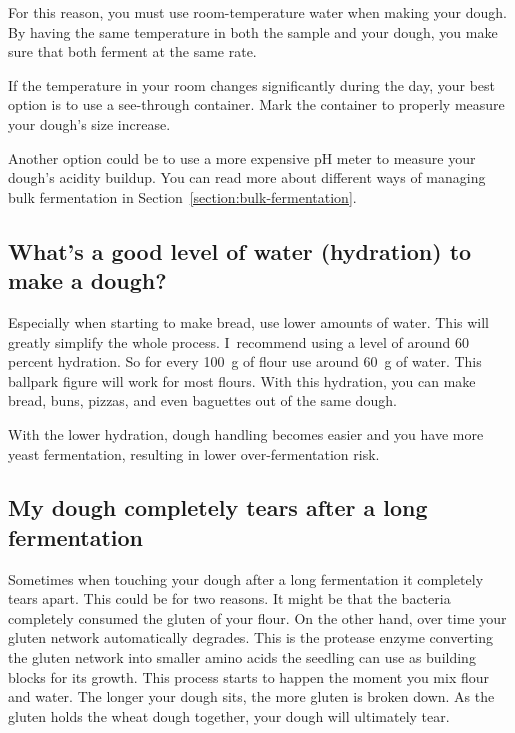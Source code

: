 For this reason, you must use room-temperature water when
making your dough. By having the same temperature in both the sample
and your dough, you make sure that both ferment at the same rate.

If the temperature in your room changes significantly during the day, your
best option is to use a see-through container. Mark the container to properly
measure your dough's size increase.

Another option could be to use a more expensive pH meter to measure your
dough's acidity buildup. You can read more about different ways of managing
bulk fermentation in Section~\ref{section:bulk-fermentation}.

\subsection{What's a good level of water (hydration) to make a dough?}

Especially when starting to make bread, use lower amounts of water. This will
greatly simplify the whole process. I~recommend using a level of around 60
percent hydration. So for every \qty{100}{\gram} of flour use around \qty{60}{\gram} of water.
This ballpark figure will work for most flours. With this hydration, you can
make bread, buns, pizzas, and even baguettes out of the same dough.

With the lower hydration, dough handling becomes easier and you have more yeast
fermentation, resulting in lower over-fermentation risk.

\subsection{My dough completely tears after a long fermentation}

Sometimes when touching your dough after a long fermentation
it completely tears apart. This could be for two reasons. It might
be that the bacteria completely consumed the gluten of your flour.
On the other hand, over time your gluten network automatically
degrades. This is the protease enzyme converting the gluten
network into smaller amino acids the seedling can use as
building blocks for its growth. This process starts to happen
the moment you mix flour and water. The longer your dough sits,
the more gluten is broken down. As the gluten holds the
wheat dough together, your dough will ultimately tear.

